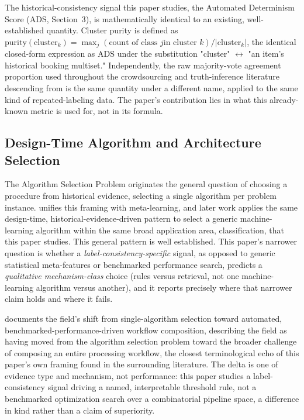 \documentclass[11pt]{article}
\begin{document}
The historical-consistency signal this paper studies, the Automated
Determinism Score (ADS, Section~3), is mathematically identical to an
existing, well-established quantity. Cluster purity
\citep{manning2008,amigo2009} is defined as
$\mathrm{purity}(\mathrm{cluster}_k) = \max_j(\text{count of class }j\text{
in cluster }k) / |\mathrm{cluster}_k|$, the identical closed-form
expression as ADS under the substitution "cluster" $\leftrightarrow$ "an
item's historical booking multiset." Independently, the raw majority-vote
agreement proportion used throughout the crowdsourcing and truth-inference
literature descending from \citet{dawidskene1979} is the same quantity under
a different name, applied to the same kind of repeated-labeling data. The
paper's contribution lies in what this already-known metric is used for, not
in its formula.

\subsection{Design-Time Algorithm and Architecture Selection}
\label{sec:design-time-selection}

The Algorithm Selection Problem \citep{rice1976} originates the general
question of choosing a procedure from historical evidence, selecting a single
algorithm per problem instance. \citet{smithmiles2009} unifies this framing
with meta-learning, and later work applies the same design-time,
historical-evidence-driven pattern to select a generic machine-learning
algorithm within the same broad application area, classification, that this
paper studies. This general pattern is well established. This paper's
narrower question is whether a \emph{label-consistency-specific}
signal, as opposed to generic statistical meta-features or benchmarked
performance search, predicts a \emph{qualitative mechanism-class} choice
(rules versus retrieval, not one machine-learning algorithm versus another),
and it reports precisely where that narrower claim holds and where it fails.

\citet{barbudo2023} documents the field's shift from single-algorithm
selection toward automated, benchmarked-performance-driven workflow
composition, describing the field as having moved from the algorithm
selection problem toward the broader challenge of composing an entire
processing workflow, the closest terminological echo of this paper's own
framing found in the surrounding literature. The delta is one of evidence
type and mechanism, not performance: this paper studies a label-consistency signal driving a named,
interpretable threshold rule, not a benchmarked optimization search over a
combinatorial pipeline space, a difference in kind rather than a claim of
superiority.
\end{document}
